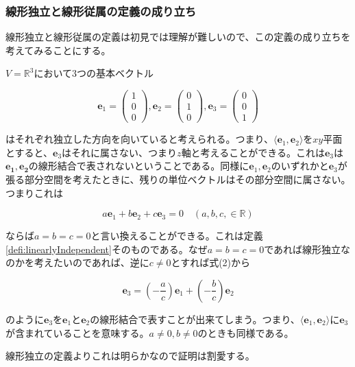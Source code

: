 \documentclass[dvipdfmx,autodetect-engine]{jsarticle}
\newcommand{\vecSpace}[1]{\mathbb{R}^{#1}}
\begin{document}
\subsubsection{線形独立と線形従属の定義の成り立ち}

線形独立と線形従属の定義は初見では理解が難しいので、この定義の成り立ちを考えてみることにする。

$V = \vecSpace{3}$において3つの基本ベクトル

$$
\bm{e}_1 = \begin{pmatrix}
1 \\
0 \\
0
\end{pmatrix}, 
\bm{e}_2 = \begin{pmatrix}
0 \\
1 \\
0
\end{pmatrix}, 
\bm{e}_3 = \begin{pmatrix}
0 \\
0 \\
1
\end{pmatrix}
$$

はそれぞれ独立した方向を向いていると考えられる。つまり、$\langle \bm{e}_1, \bm{e}_2 \rangle$を$xy$平面とすると、$\bm{e}_3$はそれに属さない、つまり$z$軸と考えることができる。これは$\bm{e}_3$は$\bm{e_1}, \bm{e_2}$の線形結合で表されないということである。同様に$\bm{e}_1, \bm{e}_2$のいずれかと$\bm{e}_3$が張る部分空間を考えたときに、残りの単位ベクトルはその部分空間に属さない。つまりこれは

\begin{equation}
    a\bm{e}_1 + b\bm{e}_2 + c\bm{e}_3 = 0 \quad (a, b, c, \in \mathbb{R}) 
\end{equation}

ならば$a = b = c = 0$と言い換えることができる。これは定義\ref{defi:linearlyIndependent}そのものである。なぜ$a = b = c = 0$であれば線形独立なのかを考えたいのであれば、逆に$c \neq 0$とすれば式(2)から

$$
\bm{e}_3 = \left(-\frac{a}{c}\right)\bm{e}_1 + \left(-\frac{b}{c}\right)\bm{e}_2
$$

のように$\bm{e}_3$を$\bm{e}_1$と$\bm{e}_2$の線形結合で表すことが出来てしまう。つまり、$\langle \bm{e}_1, \bm{e}_2 \rangle$に$\bm{e}_3$が含まれていることを意味する。$a \neq 0, b \neq 0$のときも同様である。

線形独立の定義よりこれは明らかなので証明は割愛する。
\end{document}
